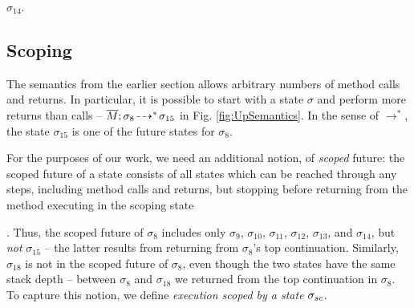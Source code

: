  $\sigma_{14}$.

  
 \subsection{Scoping}
 \label{sect:bounded}

{The semantics from the earlier section allows arbitrary numbers of method calls and returns. 
In particular, it is possible to start with a state $\sigma$ and perform more returns than calls --
\eg $\overline{M};\sigma_{8}\! \dashrightarrow^*\! {\sigma_{15}}$  in  Fig. \ref{fig:UpSemantics}.
{In the sense of $\rightarrow^*$,  the state $\sigma_{15}$  is one of the future  states for $\sigma_8$.}

 
{For} the purposes of our work, we   need an {additional} notion, of  \emph{scoped} future:  
the scoped future of a state consists of all states which  can be reached through any   
 steps, including method calls and returns, but   {stopping before returning}   
from the method executing in the scoping state}. 
Thus, the {scoped} future  of $\sigma_8$   includes only
  $\sigma_9$, $\sigma_{10}$, $\sigma_{11}$, $\sigma_{12}$, $\sigma_{13}$, and $\sigma_{14}$, but \emph{not} $\sigma_{15}$  -- the latter results from returning from $\sigma_{8}$'s top continuation.  
 {Similarly, $\sigma_{18}$ is not in the scoped future of $\sigma_8$, even though the two states have the same stack depth -- between $\sigma_{8}$  and  $\sigma_{18}$ we returned from the top continuation in $\sigma_{8}$.}
 To capture this  notion, we define    {\emph{execution scoped by a state} $\sigma_{sc}$.}

